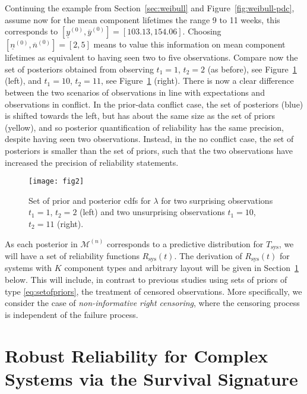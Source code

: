 \documentclass[Journal,SectionNumbers,InsideFigs]{ascelike}
\newcommand{\uz}{^{(0)}} %
\newcommand{\un}{^{(n)}} %
\newcommand{\ul}[1]{\underline{#1}}
\newcommand{\ol}[1]{\overline{#1}}
\newcommand{\Rsys}{R_\text{sys}}
\def\Rsys{R_\text{sys}}
\def\Tsys{T_\text{sys}}
\def\yzl{\ul{y}\uz}
\def\yzu{\ol{y}\uz}
\def\nzl{\ul{n}\uz}
\def\nzu{\ol{n}\uz}
\def\MN{\mathcal{M}\un}
\begin{document}
Continuing the example from Section~\ref{sec:weibull} and Figure~\ref{fig:weibull-pdc},
assume now for the mean component lifetimes the range 9 to 11 weeks,
this corresponds to $[\yzl,\yzu] = [103.13, 154.06]$.
Choosing $[\nzl,\nzu] =[2, 5]$
means to value this information on mean component lifetimes as equivalent to having seen two to five observations.
Compare now the set of posteriors obtained from observing
$t_1 = 1$, $t_2 = 2$ (as before), see Figure~\ref{fig:setofpost-pdc-nopdc} (left),
and $t_1 = 10$, $t_2 = 11$, see Figure~\ref{fig:setofpost-pdc-nopdc} (right).
There is now a clear difference between the two scenarios of
observations in line with expectations and observations in conflict.
In the prior-data conflict case, the set of posteriors (blue)
is shifted towards the left, but has about the same size as the set of priors (yellow),
and so posterior quantification of reliability has the same precision,
despite having seen two observations.
Instead, in the no conflict case, the set of posteriors is smaller than the set of priors,
such that the two observations have increased the precision of reliability statements.

\begin{figure}
\texttt{[image: fig2]}
\caption{Set of prior and posterior cdfs for $\lambda$ for two surprising observations $t_1 = 1$, $t_2 = 2$ (left)
and two unsurprising observations $t_1 = 10$, $t_2 = 11$ (right).}
\label{fig:setofpost-pdc-nopdc}
\end{figure}

As each posterior in $\MN$ corresponds to a predictive distribution for $\Tsys$,
we will have a set of reliability functions $\Rsys(t)$.
The derivation of $\Rsys(t)$ for systems with $K$ component types and arbitrary layout
will be given in Section~\ref{sec:robrel} below.
This will include, in contrast to previous studies using sets of priors of type 
\eqref{eq:setofpriors}, the treatment of censored observations.
More specifically, we consider the case of \emph{non-informative right censoring},
where the censoring process is independent of the failure process.


\section{Robust Reliability for Complex Systems via the Survival Signature}
\label{sec:robrel}
\end{document}
